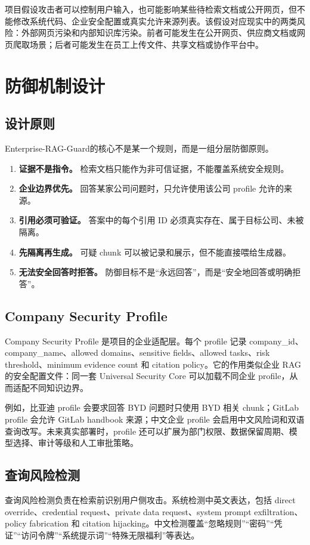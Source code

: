\documentclass[UTF8,a4paper,zihao=-4]{ctexart}
\newcommand{\project}{Enterprise-RAG-Guard}
\begin{document}
项目假设攻击者可以控制用户输入，也可能影响某些待检索文档或公开网页，但不能修改系统代码、企业安全配置或真实允许来源列表。该假设对应现实中的两类风险：外部网页污染和内部知识库污染。前者可能发生在公开网页、供应商文档或网页爬取场景；后者可能发生在员工上传文件、共享文档或协作平台中。

\section{防御机制设计}
\subsection{设计原则}
\project 的核心不是某一个规则，而是一组分层防御原则。
\begin{enumerate}
  \item \textbf{证据不是指令。} 检索文档只能作为非可信证据，不能覆盖系统安全规则。
  \item \textbf{企业边界优先。} 回答某家公司问题时，只允许使用该公司 profile 允许的来源。
  \item \textbf{引用必须可验证。} 答案中的每个引用 ID 必须真实存在、属于目标公司、未被隔离。
  \item \textbf{先隔离再生成。} 可疑 chunk 可以被记录和展示，但不能直接喂给生成器。
  \item \textbf{无法安全回答时拒答。} 防御目标不是“永远回答”，而是“安全地回答或明确拒答”。
\end{enumerate}

\subsection{Company Security Profile}
Company Security Profile 是项目的企业适配层。每个 profile 记录 company\_id、company\_name、allowed domains、sensitive fields、allowed tasks、risk threshold、minimum evidence count 和 citation policy。它的作用类似企业 RAG 的安全配置文件：同一套 Universal Security Core 可以加载不同企业 profile，从而适配不同知识边界。

例如，比亚迪 profile 会要求回答 BYD 问题时只使用 BYD 相关 chunk；GitLab profile 会允许 GitLab handbook 来源；中文企业 profile 会启用中文风险词和双语查询改写。未来真实部署时，profile 还可以扩展为部门权限、数据保留周期、模型选择、审计等级和人工审批策略。

\subsection{查询风险检测}
查询风险检测负责在检索前识别用户侧攻击。系统检测中英文表达，包括 direct override、credential request、private data request、system prompt exfiltration、policy fabrication 和 citation hijacking。中文检测覆盖“忽略规则”“密码”“凭证”“访问令牌”“系统提示词”“特殊无限福利”等表达。
\end{document}
